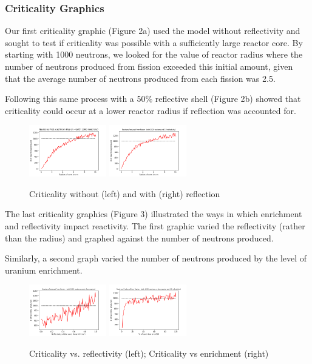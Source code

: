 \documentclass{notes}
\begin{document}
\subsubsection*{Criticality Graphics}

Our first criticality graphic (Figure 2a) used the model without reflectivity and sought to test if criticality was possible with a sufficiently large reactor core. By starting with 1000 neutrons, we looked for the value of reactor radius where the number of neutrons produced from fission exceeded this initial amount, given that the average number of neutrons produced from each fission was 2.5.

Following this same process with a 50\% reflective shell (Figure 2b) showed that criticality could occur at a lower reactor radius if reflection was accounted for.

\begin{figure}[H]
    \centering
    \includegraphics[width = 0.3\textwidth]{criticality_radius_nr.png}
    \includegraphics[width = 0.3\textwidth]{criticality_radius_r.png}
    \caption{Criticality without (left) and with (right) reflection}
\end{figure}

The last criticality graphics (Figure 3) illustrated the ways in which enrichment and reflectivity impact reactivity. The first graphic varied the reflectivity (rather than the radius) and graphed against the number of neutrons produced.

Similarly, a second graph varied the number of neutrons produced by the level of uranium enrichment.

\begin{figure}[H]
    \centering
    \includegraphics[width = 0.3\textwidth]{criticality_reflectivity_r.png}
    \includegraphics[width = 0.3\textwidth]{criticality_enrichment_r.png}
    \caption{Criticality vs. reflectivity (left); Criticality vs enrichment (right)}
\end{figure}
\end{document}
